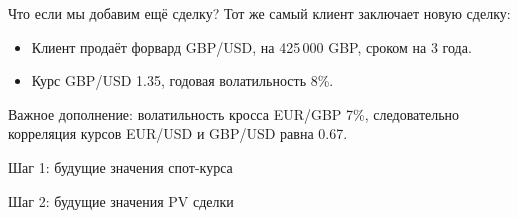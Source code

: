 \documentclass{beamer}
\begin{document}
\begin{frame}{Что если мы добавим ещё сделку?}
\justify
Тот же самый клиент заключает новую сделку:
\begin{itemize}
\item Клиент продаёт форвард GBP/USD, на 425\,000 GBP, сроком на 3 года.
\item Курс GBP/USD 1.35, годовая волатильность 8\%.
\end{itemize}

\vspace{\baselineskip}
Важное дополнение: волатильность кросса EUR/GBP 7\%, следовательно корреляция курсов EUR/USD и GBP/USD равна 0.67.
\end{frame}



\begin{frame}{Шаг 1: будущие значения спот-курса}
\begin{figure}
\centering
\end{figure}
\end{frame}



\begin{frame}{Шаг 2: будущие значения PV сделки}
\begin{figure}
\centering
\end{figure}
\end{frame}
\end{document}
